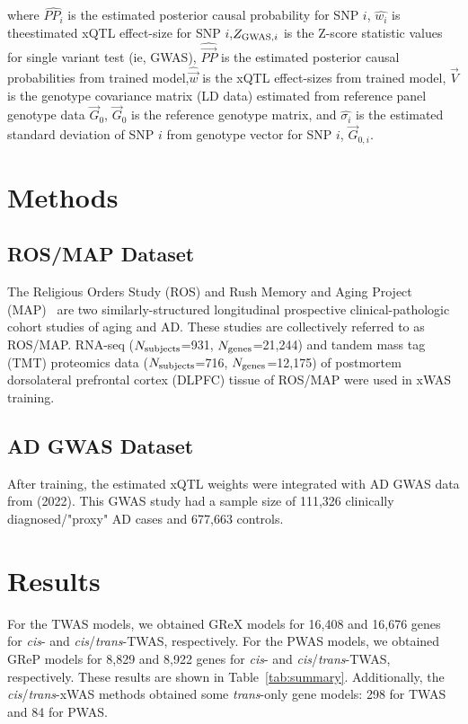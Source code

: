 \documentclass[11pt,hidelinks]{article}
\begin{document}
where  $\widehat{PP_{i}}$ is the estimated posterior causal probability for SNP $i$, $\widehat{w_{i}}$ is theestimated xQTL effect-size for SNP $i$,$Z_{\textnormal{GWAS},i}$ is the Z-score statistic values for single variant test (ie, GWAS), $\widehat{\vec{PP}}$ is the estimated posterior causal probabilities from trained model,${\widehat{\vec{w}}}$ is the xQTL effect-sizes from trained model, $\vec{V}$ is the genotype covariance matrix (LD data) estimated from reference panel genotype data $\vec{G}_0$, $\vec{G}_{0}$ is the reference genotype matrix, and $\widehat{\sigma_{i}}$ is the estimated standard deviation of SNP $i$ from genotype vector for SNP $i$, $\vec{G}_{0,i}$.


\section{Methods} 

\subsection{ROS/MAP Dataset} %
The Religious Orders Study (ROS) and Rush Memory and Aging Project (MAP)~\cite{bennettReligiousOrdersStudy2018} are two similarly-structured longitudinal prospective clinical-pathologic cohort studies of aging and AD. These studies are collectively referred to as ROS/MAP. RNA-seq ($N_{\textnormal{subjects}}$=931, $N_{\textnormal{genes}}$=21,244) and tandem mass tag (TMT) proteomics data ($N_{\textnormal{subjects}}$=716, $N_{\textnormal{genes}}$=12,175) of postmortem dorsolateral prefrontal cortex (DLPFC) tissue of ROS/MAP were used in xWAS training. 

\subsection{AD GWAS Dataset} %
After training, the estimated xQTL weights were integrated with AD GWAS data from \citeauthor{bellenguezNewInsightsGenetic2022} (2022). This GWAS study had a sample size of 111,326 clinically diagnosed/"proxy" AD cases and 677,663 controls.

\section{Results}
For the TWAS models, we obtained GReX models for 16,408 and 16,676 genes for \textit{cis}- and \textit{cis}/\textit{trans}-TWAS, respectively. For the PWAS models, we obtained GReP models for 8,829 and 8,922 genes for \textit{cis}- and \textit{cis}/\textit{trans}-TWAS, respectively. These results are shown in Table~\ref{tab:summary}. Additionally, the \textit{cis}/\textit{trans}-xWAS methods obtained some \textit{trans}-only gene models: 298 for TWAS and 84 for PWAS. 
\end{document}

